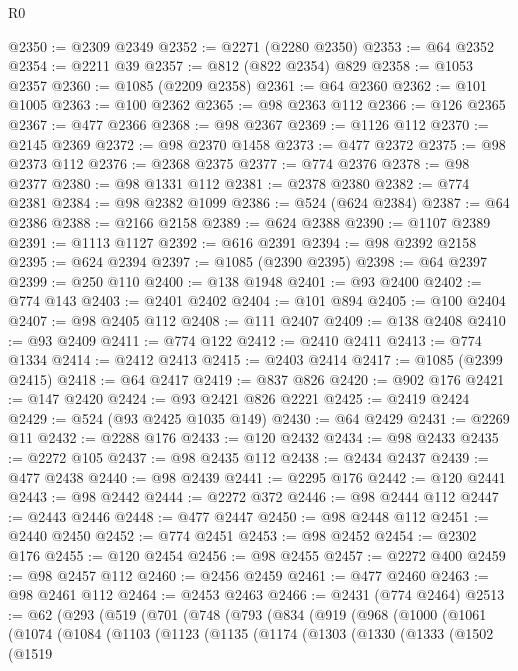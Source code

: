 \begin{lexlean}{R0}
\begin{coremodule}
@2350 := @2309 @2349
@2352 := @2271 (@2280 @2350)
@2353 := @64 @2352
@2354 := @2211 @39
@2357 := @812 (@822 @2354) @829
@2358 := @1053 @2357
@2360 := @1085 (@2209 @2358)
@2361 := @64 @2360
@2362 := @101 @1005
@2363 := @100 @2362
@2365 := @98 @2363 @112
@2366 := @126 @2365
@2367 := @477 @2366
@2368 := @98 @2367
@2369 := @1126 @112
@2370 := @2145 @2369
@2372 := @98 @2370 @1458
@2373 := @477 @2372
@2375 := @98 @2373 @112
@2376 := @2368 @2375
@2377 := @774 @2376
@2378 := @98 @2377
@2380 := @98 @1331 @112
@2381 := @2378 @2380
@2382 := @774 @2381
@2384 := @98 @2382 @1099
@2386 := @524 (@624 @2384)
@2387 := @64 @2386
@2388 := @2166 @2158
@2389 := @624 @2388
@2390 := @1107 @2389
@2391 := @1113 @1127
@2392 := @616 @2391
@2394 := @98 @2392 @2158
@2395 := @624 @2394
@2397 := @1085 (@2390 @2395)
@2398 := @64 @2397
@2399 := @250 @110
@2400 := @138 @1948
@2401 := @93 @2400
@2402 := @774 @143
@2403 := @2401 @2402
@2404 := @101 @894
@2405 := @100 @2404
@2407 := @98 @2405 @112
@2408 := @111 @2407
@2409 := @138 @2408
@2410 := @93 @2409
@2411 := @774 @122
@2412 := @2410 @2411
@2413 := @774 @1334
@2414 := @2412 @2413
@2415 := @2403 @2414
@2417 := @1085 (@2399 @2415)
@2418 := @64 @2417
@2419 := @837 @826
@2420 := @902 @176
@2421 := @147 @2420
@2424 := @93 @2421 @826 @2221
@2425 := @2419 @2424
@2429 := @524 (@93 @2425 @1035 @149)
@2430 := @64 @2429
@2431 := @2269 @11
@2432 := @2288 @176
@2433 := @120 @2432
@2434 := @98 @2433
@2435 := @2272 @105
@2437 := @98 @2435 @112
@2438 := @2434 @2437
@2439 := @477 @2438
@2440 := @98 @2439
@2441 := @2295 @176
@2442 := @120 @2441
@2443 := @98 @2442
@2444 := @2272 @372
@2446 := @98 @2444 @112
@2447 := @2443 @2446
@2448 := @477 @2447
@2450 := @98 @2448 @112
@2451 := @2440 @2450
@2452 := @774 @2451
@2453 := @98 @2452
@2454 := @2302 @176
@2455 := @120 @2454
@2456 := @98 @2455
@2457 := @2272 @400
@2459 := @98 @2457 @112
@2460 := @2456 @2459
@2461 := @477 @2460
@2463 := @98 @2461 @112
@2464 := @2453 @2463
@2466 := @2431 (@774 @2464)
@2513 := @62
    (@293
      (@519
        (@701
          (@748
            (@793
              (@834
                (@919
                  (@968
                    (@1000
                      (@1061
                        (@1074
                          (@1084
                            (@1103
                              (@1123
                                (@1135
                                  (@1174
                                    (@1303
                                      (@1330
                                        (@1333
                                          (@1502
                                            (@1519

\end{coremodule}
\end{lexlean}
